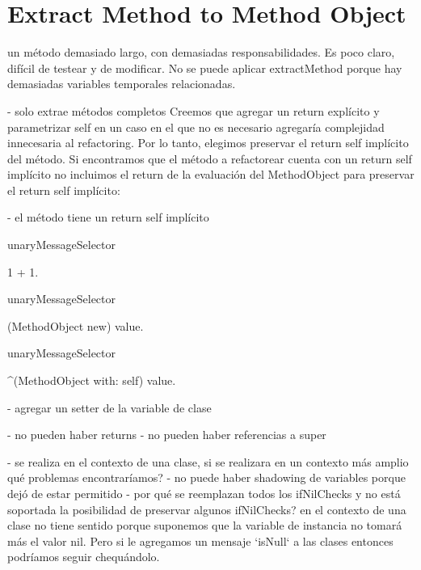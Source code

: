 \section{Extract Method to Method Object}

un método demasiado largo, con demasiadas responsabilidades. Es poco claro, difícil de testear y de
modificar. No se puede aplicar extractMethod porque hay demasiadas variables temporales
relacionadas.


- solo extrae métodos completos
Creemos que agregar un return explícito y parametrizar self en un caso en el que no es necesario
agregaría complejidad innecesaria al refactoring. Por lo tanto, elegimos preservar el return self
implícito del método. Si encontramos que el método a refactorear cuenta con un return self implícito
no incluimos el return de la evaluación del MethodObject para preservar el return self implícito:

- el método tiene un return self implícito

\begin{code}

unaryMessageSelector

 1 + 1.

unaryMessageSelector
 
 (MethodObject new) value.

unaryMessageSelector

 ^(MethodObject with: self) value.

\end{code}

- agregar un setter de la variable de clase

- no pueden haber returns
- no pueden haber referencias a super



- se realiza en el contexto de una clase, si se realizara en un contexto más amplio qué problemas encontraríamos?
- no puede haber shadowing de variables porque dejó de estar permitido
- por qué se reemplazan todos los ifNilChecks y no está soportada la posibilidad de preservar algunos ifNilChecks? 
en el contexto de una clase no tiene sentido porque suponemos que la variable de instancia no
tomará más el valor nil. Pero si le agregamos un mensaje `isNull` a las clases entonces
podríamos seguir chequándolo. 


